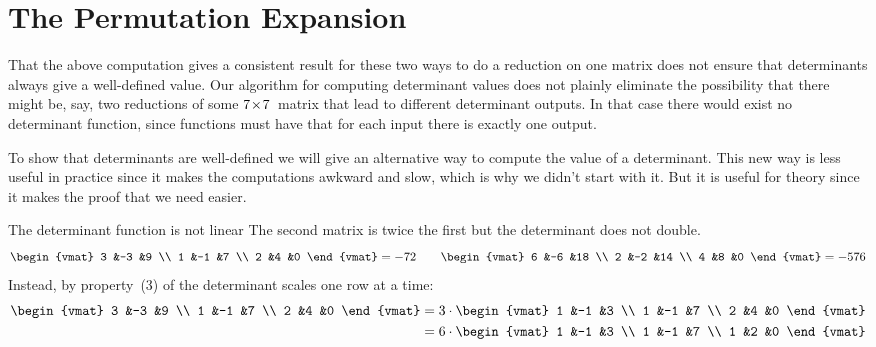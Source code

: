 \documentclass[10pt,t,serif,professionalfont]{beamer}
\begin{document}
\section{The Permutation Expansion}
\begin{frame}
\end{frame}
\begin{frame}
That the above computation gives a consistent result for these two
ways to do a reduction on one matrix does not ensure that determinants
always give a well-defined value.
Our algorithm for computing determinant values does not
plainly eliminate the possibility that there might be, say,
two reductions of some $7 \! \times \! 7$~matrix that lead to different 
determinant outputs.
In that case there would exist no determinant function, 
since functions must have that for each input there is exactly one output. 

\pause
To show that determinants are well-defined 
we will give an alternative way to compute
the value of a determinant. 
This new way is less useful in practice since it 
makes the computations awkward and slow, which is why we didn't start with it.
But it is useful for theory since it makes the proof that we need easier.
\end{frame}



\begin{frame}{The determinant function is not linear}
\ex
The second matrix is twice the first but the determinant does not double.
\begin{equation*}
  \begin{vmat}
    3  &-3  &9 \\
    1  &-1   &7 \\
    2  &4   &0
  \end{vmat}
  =-72
  \qquad
  \begin{vmat}
    6  &-6  &18 \\
    2  &-2   &14 \\
    4  &8   &0
  \end{vmat}
  =-576
\end{equation*}
Instead, by property~(3) of 
the determinant scales one row at a time:   
\begin{align*}
  \begin{vmat}
    3  &-3  &9 \\
    1  &-1   &7 \\
    2  &4   &0
  \end{vmat}
  &=3\cdot
  \begin{vmat}
    1  &-1  &3 \\
    1  &-1   &7 \\
    2  &4   &0
  \end{vmat}           \\
  &=6\cdot
  \begin{vmat}
    1  &-1  &3 \\
    1  &-1   &7 \\
    1  &2   &0
  \end{vmat}           
\end{align*}
\end{frame}
\end{document}
